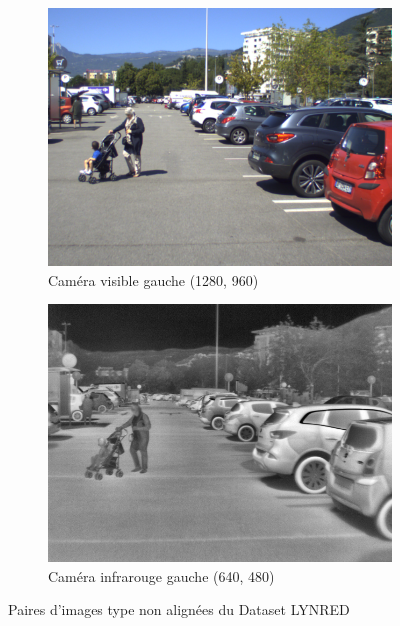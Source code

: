 \documentclass[12pt]{article}
\begin{document}
\begin{figure}[h!]
    \centering
    \begin{subfigure}[b]{0.45\textwidth}
        \centering
        \includegraphics[width=\textwidth]{images/VIS.png}
        \caption{Caméra visible gauche (1280, 960)}
        \label{fig:vis_exemple}
    \end{subfigure}
    \hfill
    \begin{subfigure}[b]{0.45\textwidth}
        \centering
        \includegraphics[width=\textwidth]{images/IR.png}
        \caption{Caméra infrarouge gauche (640, 480)}
        \label{fig:ir_exemple}
    \end{subfigure}
    \caption{Paires d'images type non alignées du Dataset LYNRED}
    \label{fig:two_images}
\end{figure}


\newpage
{}
% 
\end{document}
